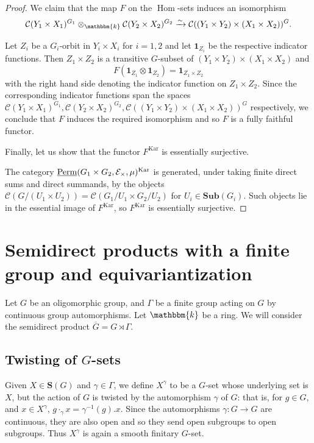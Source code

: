 \documentclass[11pt,a4paper]{amsart}
\theoremstyle{plain}%
\theoremstyle{definition}
\theoremstyle{remark}
\newcommand{\Hom}{\operatorname{Hom}}
\newcommand{\Perm}{\underline{{\rm Perm}}}
\newcommand{\kk}{\mathbbm{k}}
\newcommand{\one}{{\mathbf{1}}}
\newcommand{\Kar}{\mathrm{Kar}}
\newcommand{\cC}{\mathcal{C}}
\newcommand{\Sub}{\mathbf{Sub}}
\newcommand{\cE}{\mathcal{E}}
\newcommand{\Set}[1]{\mathbf{S}(#1)}
\newcommand{\oG}{{\overline{G}}}
\begin{document}
\begin{proof}
\medskip

We claim that the map $F$ on the $\Hom$-sets induces an isomorphism
\[\cC(Y_1 \times X_1)^{G_1} \otimes_\kk\cC(Y_2 \times X_2)^{G_2} \xrightarrow{\sim}\cC((Y_1 \times Y_2) \times (X_1 \times X_2))^G.\]

Let $Z_i$ {be} a $G_i$-orbit in ${Y_i\times X_i}$ for $i=1,2$ and let $\one_{Z_i}$ be the respective indicator functions. Then $Z_1\times Z_2$ is a transitive $G$-subset of ${(Y_1\times Y_2)\times(X_1\times X_2)}$ and $$F(\one_{Z_1}\otimes \one_{Z_2}) = \one_{Z_1\times Z_2}$$ with the right hand side denoting the indicator function on $Z_1\times Z_2$. Since the corresponding indicator functions span the spaces  $\cC(Y_1 \times X_1)^{G_1},  \cC(Y_2 \times X_2)^{G_2}, \cC((Y_1 \times Y_2) \times (X_1 \times X_2))^G$ respectively, we conclude that $F$ induces the required isomorphism and so $F$ is a fully faithful functor.

\medskip

Finally, let us show that the functor $F^{\Kar}$ is essentially surjective. 

The category $\Perm(G_1\times G_2,\cE_{\times},\mu)^{\Kar}$ is generated, under taking finite direct sums and direct summands, by the objects $\cC(G/(U_1\times U_2))= \cC(G_1/U_1\times G_2/U_2)$ for $U_i\in \Sub({G_i})$. Such objects lie in the essential image of $F^{\Kar}$, so $F^{\Kar}$ is essentially surjective.

\end{proof}






\section{Semidirect products with a finite group and equivariantization}\label{subsec:equivariantization}
Let $G$ be an oligomorphic group, and $\Gamma$ be a finite group acting on $G$ by continuous group automorphisms. Let $\kk$ be a ring. We will consider the semidirect product $\oG=G\rtimes \Gamma$. 

\subsection{Twisting of \texorpdfstring{$G$-sets}{G-sets}}

Given $X\in \Set{G}$ and $\gamma\in \Gamma$, we define $X^{\gamma}$ to be a $G$-set whose underlying set is $X$, but the action of $G$ is twisted by the automorphism $\gamma$ of $G$: that is, for $g\in G$, and $x\in X^{\gamma}$, $g\cdot_\gamma x=\gamma^{-1}(g).x$. Since the automorphisms $\gamma: G\to G$ are continuous, they are also open and so they send open subgroups to open subgroups. Thus $X^\gamma$ is again a smooth finitary $G$-set. 
\end{document}
